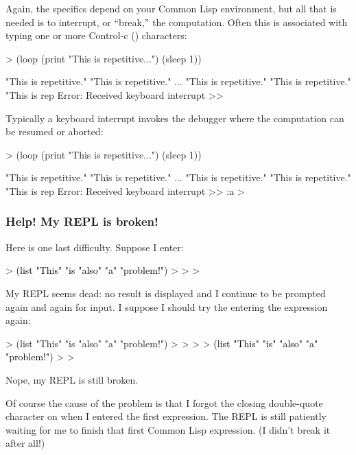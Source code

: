 \documentclass[10pt,twoside,english,pdftex]{article}
\begin{document}
Again, the specifics depend on your Common Lisp environment, but all that is
needed is to interrupt, or ``break,'' the computation.  Often this is
associated with typing one or more Control-c () characters:
%
\begin{example}\color{darkergray}%
  > (loop (print "This is repetitive...") (sleep 1))

  "This is repetitive." 
  "This is repetitive." 
       ...
  "This is repetitive." 
  "This is repetitive." 
  "This is rep\textcolor{black}{}
  Error: Received keyboard interrupt 
  >>
\end{example}
%
Typically a keyboard interrupt invokes the debugger where the computation
can be resumed or aborted:
%
\begin{example}\color{darkergray}%
  > (loop (print "This is repetitive...") (sleep 1))

  "This is repetitive." 
  "This is repetitive." 
       ...
  "This is repetitive." 
  "This is repetitive." 
  "This is rep
  Error: Received keyboard interrupt 
  >> \textcolor{black}{:a}
  >
\end{example}

\subsubsection*{Help! My REPL is broken!}

Here is one last difficulty.  Suppose I enter:
%
\begin{example}\color{darkergray}%
  > \textcolor{black}{(list "This" "is "also" "a" "problem!")}
  >
  >
  >
\end{example}
%
My REPL seems dead: no result is displayed and I continue to be prompted again
and again for input.  I suppose I should try the entering the expression
again:
%
\begin{example}\color{darkergray}%
  > (list "This" "is "also" "a" "problem!")
  >
  >
  >
  > \textcolor{black}{(list "This" "is" "also" "a" "problem!")}
  >
  >
\end{example}
%
Nope, my REPL is still broken.

Of course the cause of the problem is that I forgot the closing double-quote
character on  when I entered the first expression.  The REPL is
still patiently waiting for me to finish that first Common Lisp expression.
(I didn't break it after all!)
\end{document}
